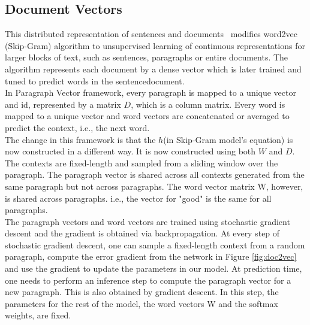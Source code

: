 \documentclass[11pt,a4paper]{article}
\begin{document}
\subsection{Document Vectors}
This distributed representation of sentences and documents~\cite{Le:14} modifies word2vec (Skip-Gram) algorithm to unsupervised learning of continuous representations for larger blocks of text, such as sentences, paragraphs or entire documents. The algorithm represents each document by a dense vector which is later trained and tuned to predict words in the sentence\/document.\\
In Paragraph Vector framework, every paragraph is mapped to a unique vector and id, represented by a matrix $D$, which is a column matrix. Every word is mapped to a unique vector and word vectors are concatenated or averaged to predict the context, i.e., the next word.\\
The change in this framework is that the $h$(in Skip-Gram model's equation) is now constructed in a different way. It is now constructed using both $W$ and $D$.\\
The contexts are fixed-length and sampled from a sliding window over the paragraph. The paragraph vector is shared across all contexts generated from the same paragraph but not across paragraphs.  The word vector matrix W, however, is shared across paragraphs. i.e., the vector for "good" is the same for all paragraphs.\\

The paragraph vectors and word vectors are trained using stochastic gradient descent and the gradient is obtained via backpropagation.  At every step of stochastic gradient descent, one can sample a fixed-length context from a random paragraph, compute the error gradient from the network in Figure \ref{fig:doc2vec} and use the gradient to update the parameters in our model. At prediction time, one needs to perform an inference step to compute the paragraph vector for a new paragraph. This is also obtained by gradient descent.  In this step, the parameters for the rest of the model, the word vectors W
and the softmax weights, are fixed.
\end{document}
